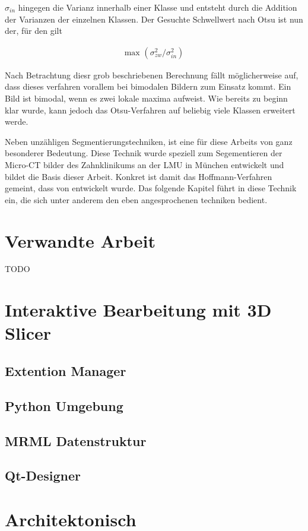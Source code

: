 $\sigma_{in}$ hingegen die Varianz innerhalb einer Klasse und entsteht durch die
Addition der Varianzen der einzelnen Klassen. Der Gesuchte Schwellwert nach Otsu
ist nun der, für den gilt

\begin{align}
	\text{max }(\sigma_{zw}^{2}/ \sigma_{in}^{2})
\end{align}

Nach Betrachtung diesr grob beschriebenen Berechnung fällt möglicherweise auf, dass
dieses verfahren vorallem bei bimodalen Bildern zum Einsatz kommt. Ein Bild ist
bimodal, wenn es zwei lokale maxima aufweist. Wie bereits zu beginn klar wurde, kann
jedoch das Otsu-Verfahren auf beliebig viele Klassen erweitert werde.

Neben unzähligen Segmentierungstechniken, ist eine für diese Arbeits von ganz besonderer
Bedeutung. Diese Technik wurde speziell zum Segementieren der Micro-CT bilder des
Zahnklinikums an der LMU in München entwickelt und bildet die Basis dieser Arbeit. Konkret
ist damit das Hoffmann-Verfahren gemeint, dass von \citet{hoffmann2020} entwickelt wurde.
Das folgende Kapitel führt in diese Technik ein, die sich unter anderem den eben
angesprochenen techniken bedient.

\section{Verwandte Arbeit}
\label{sec:verwwandte_arbeit}
TODO

\section{Interaktive Bearbeitung mit 3D Slicer}




\label{sec:3d_slicer}
\subsection{Extention Manager}
\subsection{Python Umgebung}
\subsection{MRML Datenstruktur}
\subsection{Qt-Designer}

\section{Architektonisch}
\label{sec:architektonisch}